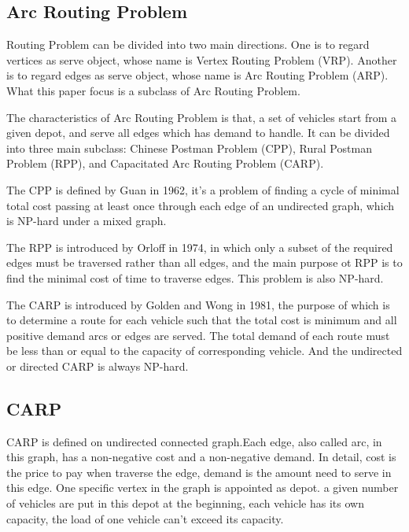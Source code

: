 \documentclass[journal]{IEEEtran}
\begin{document}
	
	\subsection{Arc Routing Problem}
	Routing Problem can be divided into two main directions. One is to regard vertices as serve object, whose name is Vertex Routing Problem (VRP). Another is to regard edges as serve object, whose name is Arc Routing Problem (ARP). What this paper focus is a subclass of Arc Routing Problem.
	
	The characteristics of Arc Routing Problem is that, a set of vehicles start from a given depot, and serve all edges which has demand to handle. It can be divided into three main subclass: Chinese Postman Problem (CPP), Rural Postman Problem (RPP), and Capacitated Arc Routing Problem (CARP). \cite{inproceedings}
	
	The CPP is defined by Guan in 1962\cite{1962Graphic}, it's a problem of finding a cycle of minimal total cost passing at least once through each edge of an undirected graph, which is NP-hard under a mixed graph. 
	
	The RPP is introduced by Orloff in 1974\cite{RPP}, in which only a subset of the required edges must be traversed rather than all edges, and the main purpose ot RPP is to find the minimal cost of time to traverse edges. This problem is also NP-hard.
	
	The CARP is introduced by Golden and Wong in 1981\cite{CARP}, the purpose of which is to determine a route for each vehicle such that the total cost is minimum and all positive demand arcs or edges are served. The total demand of each route must be less than or equal to the capacity of corresponding vehicle. And the undirected or directed CARP is always NP-hard.
	
	
	\subsection{CARP}
	CARP is defined on undirected connected graph.Each edge, also called arc, in this graph, has a non-negative cost and a non-negative demand. In detail, cost is the price to pay when traverse the edge, demand is the amount need to serve in this edge. One specific vertex in the graph is appointed as depot. a given number of vehicles are put in this depot at the beginning, each vehicle has its own capacity, the load of one vehicle can't exceed its capacity.
	
\end{document}
